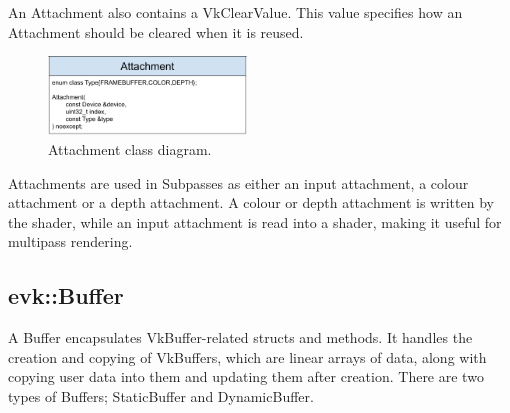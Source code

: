 \documentclass[12pt]{report}
\newcommand{\figurewidth}{0.55\textwidth}
\newcommand{\imagewidth}{0.47\textwidth}
\theoremstyle{definition}
\begin{document}
        An Attachment also contains a VkClearValue. This value specifies how an
        Attachment should be cleared when it is reused. \\

        \begin{figure}
          \centering
          \includegraphics[width=\imagewidth]{images/class_attachment.png}
          \caption{Attachment class diagram.}
          \label{fig:class_attachment}  
        \end{figure}

        Attachments are used in Subpasses as either an input attachment, a
        colour attachment or a depth attachment. A colour or depth attachment
        is written by the shader, while an input attachment is read into a
        shader, making it useful for multipass rendering.

      \subsection{evk::Buffer}

        A Buffer encapsulates VkBuffer-related structs and methods. It handles
        the creation and copying of VkBuffers, which are linear arrays of
        data, along with copying user data into them and updating them after
        creation. There are two types of Buffers; StaticBuffer and
        DynamicBuffer. \\
\end{document}
